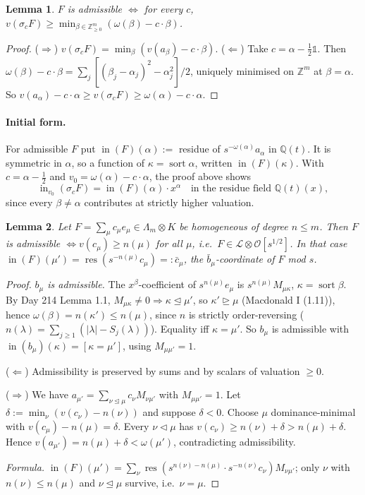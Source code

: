 \documentclass[11pt]{article}
\newtheorem{lemma}{Lemma}[section]
\theoremstyle{definition}
\newcommand{\Q}{\mathbb{Q}}
\newcommand{\Z}{\mathbb{Z}}
\newcommand{\dom}{\trianglerighteq}
\newcommand{\domd}{\trianglelefteq}
\newcommand{\sdomd}{\triangleleft}
\newcommand{\sort}{\operatorname{sort}}
\newcommand{\inn}{\operatorname{in}}
\newcommand{\res}{\operatorname{res}}
\newcommand{\one}{\mathbb{1}}
\newcommand{\cO}{\mathcal{O}}
\newcommand{\cL}{\mathcal{L}}
\begin{document}
\begin{lemma}\label{lem:adm}
$F$ is admissible $\iff$ for every $c$, $v(\sigma_cF)\ge\min_{\beta\in\Z^m_{\ge0}}(\omega(\beta)-c\cdot\beta)$.
\end{lemma}
\begin{proof}
($\Rightarrow$) $v(\sigma_cF)=\min_\beta(v(a_\beta)-c\cdot\beta)$. ($\Leftarrow$) Take $c=\alpha-\tfrac12\one$. Then $\omega(\beta)-c\cdot\beta=\sum_j[(\beta_j-\alpha_j)^2-\alpha_j^2]/2$, uniquely minimised on $\Z^m$ at $\beta=\alpha$. So $v(a_\alpha)-c\cdot\alpha\ge v(\sigma_cF)\ge\omega(\alpha)-c\cdot\alpha$.
\end{proof}

\paragraph{Initial form.} For admissible $F$ put $\inn(F)(\alpha):=$ residue of $s^{-\omega(\alpha)}a_\alpha$ in $\Q(t)$. It is symmetric in $\alpha$, so a function of $\kappa=\sort\alpha$, written $\inn(F)(\kappa)$. With $c=\alpha-\frac12$ and $v_0=\omega(\alpha)-c\cdot\alpha$, the proof above shows
\begin{equation}\tag{1.2}
\inn_{v_0}(\sigma_cF)=\inn(F)(\alpha)\cdot x^\alpha\quad\text{in the residue field }\Q(t)(x),
\end{equation}
since every $\beta\neq\alpha$ contributes at strictly higher valuation.

\begin{lemma}\label{lem:L}
Let $F=\sum_\mu c_\mu e_\mu\in\Lambda_m\otimes K$ be homogeneous of degree $n\le m$. Then $F$ is admissible $\iff v(c_\mu)\ge n(\mu)$ for all $\mu$, i.e.\ $F\in\cL\otimes\cO[s^{1/2}]$. In that case $\inn(F)(\mu')=\res(s^{-n(\mu)}c_\mu)=:\bar c_\mu$, the $\bar b_\mu$-coordinate of $F$ mod $s$.
\end{lemma}
\begin{proof}
\emph{$b_\mu$ is admissible.} The $x^\beta$-coefficient of $s^{n(\mu)}e_\mu$ is $s^{n(\mu)}M_{\mu\kappa}$, $\kappa=\sort\beta$. By Day 214 Lemma 1.1, $M_{\mu\kappa}\ne0\Rightarrow\kappa\domd\mu'$, so $\kappa'\dom\mu$ (Macdonald I (1.11)), hence $\omega(\beta)=n(\kappa')\le n(\mu)$, since $n$ is strictly order-reversing ($n(\lambda)=\sum_{j\ge1}(|\lambda|-S_j(\lambda))$). Equality iff $\kappa=\mu'$. So $b_\mu$ is admissible with $\inn(b_\mu)(\kappa)=[\kappa=\mu']$, using $M_{\mu\mu'}=1$.

($\Leftarrow$) Admissibility is preserved by sums and by scalars of valuation $\ge0$.

($\Rightarrow$) We have $a_{\mu'}=\sum_{\nu\domd\mu}c_\nu M_{\nu\mu'}$ with $M_{\mu\mu'}=1$. Let $\delta:=\min_\nu(v(c_\nu)-n(\nu))$ and suppose $\delta<0$. Choose $\mu$ dominance-minimal with $v(c_\mu)-n(\mu)=\delta$. Every $\nu\sdomd\mu$ has $v(c_\nu)\ge n(\nu)+\delta>n(\mu)+\delta$. Hence $v(a_{\mu'})=n(\mu)+\delta<\omega(\mu')$, contradicting admissibility.

\emph{Formula.} $\inn(F)(\mu')=\sum_\nu\res(s^{n(\nu)-n(\mu)}\cdot s^{-n(\nu)}c_\nu)M_{\nu\mu'}$; only $\nu$ with $n(\nu)\le n(\mu)$ and $\nu\domd\mu$ survive, i.e.\ $\nu=\mu$.
\end{proof}
\end{document}
